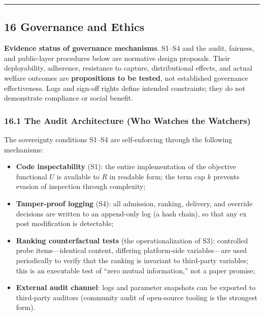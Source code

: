 \documentclass[
  11pt]{article}
\providecommand{\tightlist}{%
  \setlength{\itemsep}{0pt}\setlength{\parskip}{0pt}}
\begin{document}
\begin{center}\rule{0.5\linewidth}{0.5pt}\end{center}

\subsection{16 Governance and Ethics}\label{governance-and-ethics}

\textbf{Evidence status of governance mechanisms}. S1--S4 and the audit,
fairness, and public-layer procedures below are normative design
proposals. Their deployability, adherence, resistance to capture,
distributional effects, and actual welfare outcomes are
\textbf{propositions to be tested}, not established governance
effectiveness. Logs and sign-off rights define intended constraints;
they do not demonstrate compliance or social benefit.

\subsubsection{16.1 The Audit Architecture (Who Watches the
Watchers)}\label{the-audit-architecture-who-watches-the-watchers}

The sovereignty conditions S1--S4 are self-enforcing through the
following mechanisms:

\begin{itemize}
\tightlist
\item
  \textbf{Code inspectability} (S1): the entire implementation of the
  objective functional \(U\) is available to \(R\) in readable form; the
  term cap \(k\) prevents evasion of inspection through complexity;
\item
  \textbf{Tamper-proof logging} (S4): all admission, ranking, delivery,
  and override decisions are written to an append-only log (a hash
  chain), so that any ex post modification is detectable;
\item
  \textbf{Ranking counterfactual tests} (the operationalization of S3):
  controlled probe items---identical content, differing platform-side
  variables---are used periodically to verify that the ranking is
  invariant to third-party variables; this is an executable test of
  ``zero mutual information,'' not a paper promise;
\item
  \textbf{External audit channel}: logs and parameter snapshots can be
  exported to third-party auditors (community audit of open-source
  tooling is the strongest form).
\end{itemize}
\end{document}
